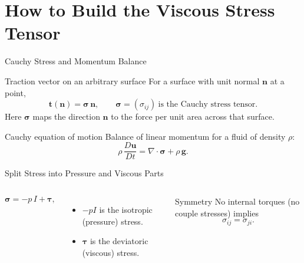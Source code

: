 \documentclass[aspectratio=169]{beamer}
\begin{document}
\section{How to Build the Viscous Stress Tensor}

\begin{frame}{Cauchy Stress and Momentum Balance}
\begin{block}{Traction vector on an arbitrary surface}
For a surface with unit normal $\mathbf{n}$ at a point,
\[
\mathbf{t}(\mathbf{n}) = \boldsymbol{\sigma}\,\mathbf{n},
\qquad
\boldsymbol{\sigma} = (\sigma_{ij})\ \text{is the Cauchy stress tensor.}
\]
Here $\boldsymbol{\sigma}$ maps the direction $\mathbf{n}$ to the
force per unit area across that surface.
\end{block}

\begin{block}{Cauchy equation of motion}
Balance of linear momentum for a fluid of density $\rho$:
\[
\rho\,\frac{D\mathbf{u}}{Dt}
=
\nabla\!\cdot \boldsymbol{\sigma}
+ \rho\,\mathbf{g}.
\]
\end{block}
\end{frame}

\begin{frame}{Split Stress into Pressure and Viscous Parts}
\begin{columns}[T,onlytextwidth]
\[
\boldsymbol{\sigma} = -p\,I + \boldsymbol{\tau},
\]
\begin{itemize}
  \item $-pI$ is the isotropic (pressure) stress.
  \item $\boldsymbol{\tau}$ is the deviatoric (viscous) stress.
\end{itemize}

\begin{block}{Symmetry}
No internal torques (no couple stresses) implies
\[
\sigma_{ij}=\sigma_{ji}.
\]
\end{block}
\end{columns}
\end{frame}
\end{document}
